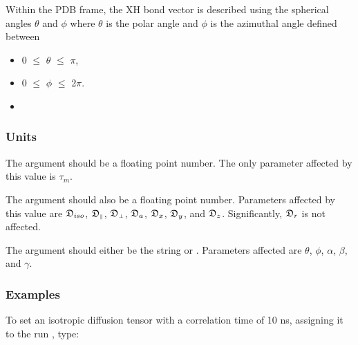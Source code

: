  Within the PDB frame, the XH bond vector is described using the spherical angles $\theta$ and $\phi$ where $\theta$ is the polar angle and $\phi$ is the azimuthal angle defined between 
  

 \begin{itemize} 
 \item[] 0 $\le$ $\theta$ $\le$ $\pi$,  
 \item[] 0 $\le$ $\phi$ $\le$ 2$\pi$.  
 \item[]  
 \end{itemize} 
  

  
 \subsubsection{Units} 

 The  argument should be a floating point number.  The only parameter affected by this value is $\tau_m$. 
  

 The  argument should also be a floating point number.  Parameters affected by this value are $\mathfrak{D}_{iso}$, $\mathfrak{D}_{\scriptscriptstyle \parallel}$, $\mathfrak{D}_{\scriptscriptstyle \perp}$, $\mathfrak{D}_a$, $\mathfrak{D}_x$, $\mathfrak{D}_y$, and $\mathfrak{D}_z$.  Significantly, $\mathfrak{D}_r$ is not affected. 
  

 The  argument should either be the string  or .  Parameters affected are $\theta$, $\phi$, $\alpha$, $\beta$, and $\gamma$. 
  

  
 \subsubsection{Examples} 

 To set an isotropic diffusion tensor with a correlation time of 10 ns, assigning it to the run , type: 
  





